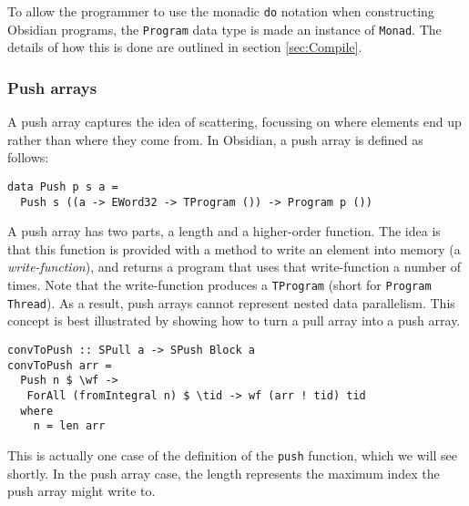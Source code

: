 To allow the programmer to use the monadic {\tt do} notation when constructing Obsidian 
programs, the {\tt Program} data type is made an instance of {\tt Monad}. The details 
of how this is done are outlined in section \ref{sec:Compile}.




\subsubsection{Push arrays} 
\label{sec:PushArrays}

A push array captures the idea of scattering, focussing on where 
elements end up rather than where they come from. In Obsidian, a push array 
is defined as follows: 

\begin{small}
\begin{verbatim}
data Push p s a =
  Push s ((a -> EWord32 -> TProgram ()) -> Program p ())
\end{verbatim}
\end{small}

A push array has two parts, a length and a higher-order function. 
The idea is that this function is provided with a method to write an 
element into memory (a {\em write-function}), and returns a program 
that uses that write-function a number of times. Note that the 
write-function produces a {\tt TProgram} (short for {\tt Program Thread}). 
As a result, push arrays cannot represent nested data parallelism. 
This concept is best illustrated by showing how to turn a pull array into a push array. 

\begin{small} 
\begin{verbatim} 
convToPush :: SPull a -> SPush Block a
convToPush arr =
  Push n $ \wf ->
   ForAll (fromIntegral n) $ \tid -> wf (arr ! tid) tid
  where
    n = len arr       
\end{verbatim}
\end{small}

\noindent
This is actually one case of the definition of the \verb!push! function, which we will see shortly.
In the push array case, the length represents the maximum index the push array 
might write to.

